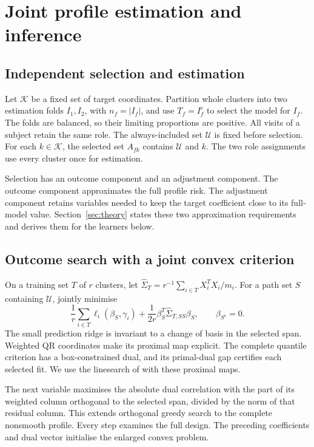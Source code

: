 \section{Joint profile estimation and inference}\label{sec:inference}

\subsection{Independent selection and estimation}\label{subsec:roles}

Let $\mathcal K$ be a fixed set of target coordinates. Partition whole
clusters into two estimation folds $I_1,I_2$, with $n_f=|I_f|$, and use
$T_f=I_f^c$ to select the model for $I_f$. The folds are balanced,
so their limiting proportions are positive. All visits of a subject retain
the same role. The always-included set $\mathcal U$ is fixed before
selection. For each $k\in\mathcal K$, the selected set $A_{fk}$ contains
$\mathcal U$ and $k$. The two role assignments use every cluster once
for estimation.

Selection has an outcome component and an adjustment component. The
outcome component approximates the full profile risk. The adjustment
component retains variables needed to keep the target coefficient close
to its full-model value. Section~\ref{sec:theory} states these two
approximation requirements and derives them for the learners below.

\subsection{Outcome search with a joint convex criterion}\label{subsec:search}

On a training set $T$ of $r$ clusters, let
$\widehat\Sigma_T=r^{-1}\sum_{i\in T}X_i^TX_i/m_i$. For a path set
$S$ containing $\mathcal U$, jointly minimise
\begin{equation}\label{eq:search-fit}
 \frac1r\sum_{i\in T}\ell_i(\beta_S,\gamma_i)
       +\frac{1}{2r}\beta_S^T\widehat\Sigma_{T,SS}\beta_S,
 \qquad \beta_{S^c}=0.
\end{equation}
The small prediction ridge is invariant to a change of basis in the
selected span. Weighted QR coordinates make its proximal map explicit.
The complete quantile criterion has a box-constrained dual, and its
primal-dual gap certifies each selected fit. We use the linesearch of
 with these proximal maps.

The next variable maximises the absolute dual correlation with the
part of its weighted column orthogonal to the selected span, divided
by the norm of that residual column. This extends orthogonal greedy
search \cite{ing2011} to the complete nonsmooth profile. Every step
examines the full design. The preceding coefficients and dual vector
initialise the enlarged convex problem.

